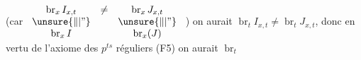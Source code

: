 (car
$\begin{array}{ccc}
\operatorname{br}_x I_{x,t}&\ne&\operatorname{br}_x J_{x,t}\\
\unsure{\Vert|\text{''}}&&\unsure{\Vert|\text{''}}\\
\operatorname{br}_x I&&\operatorname{br}_x(J)
\end{array}$
) on aurait
$\operatorname{br}_t I_{x,t}\ne\operatorname{br}_t J_{x,t}$, donc en vertu de l'axiome des  $p^{ts}$ réguliers (F5) on aurait $\operatorname{br}_t$

